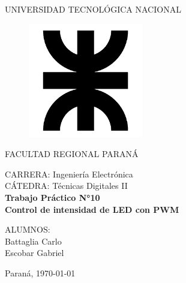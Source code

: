 \documentclass[a4paper, 12pt]{article}
\begin{document}
\begin{titlepage}
	\begin{center}
		{\large{UNIVERSIDAD TECNOLÓGICA NACIONAL}}
	\end{center}
	\vspace{15pt}
	\begin{figure}[!ht]
		\centering
		\begin{center}
			\includegraphics[width=5cm]{utn.png}
		\end{center}
	\end{figure}
	\vspace{5pt}
	\begin{center}
		{\large{FACULTAD REGIONAL PARANÁ}}
		\vspace{5pt}
		\begin{center}
			\vspace{15pt}
			\normalsize{CARRERA: Ingeniería Electrónica\\
						CÁTEDRA: Técnicas Digitales II\\}
			\vspace{50pt}
			\huge\bfseries{Trabajo Práctico N°10\\
			Control de intensidad de LED con PWM\\}
			\vspace{50pt}
		\end{center}
		
		\begin{flushleft}
			\begin{center}
				ALUMNOS:\\
				Battaglia Carlo\\
				Escobar Gabriel\\
			\end{center}
		\end{flushleft}
		
		\begin{center}
			\vspace{\fill}
			\normalsize{Paraná,}
			\today
		\end{center}
	\end{center}
\end{titlepage}
\end{document}
